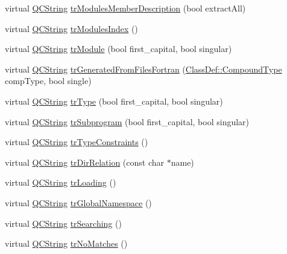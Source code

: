 \begin{DoxyCompactItemize}
\item 
virtual \hyperlink{class_q_c_string}{Q\-C\-String} \hyperlink{class_translator_polish_a26dd0f47c7f59841f901da7f4bd19306}{tr\-Modules\-Member\-Description} (bool extract\-All)
\item 
virtual \hyperlink{class_q_c_string}{Q\-C\-String} \hyperlink{class_translator_polish_a8a71cbe9e0669d3555731c3ebc0aae35}{tr\-Modules\-Index} ()
\item 
virtual \hyperlink{class_q_c_string}{Q\-C\-String} \hyperlink{class_translator_polish_a894e0b632e1680e918c78fea5b9b5384}{tr\-Module} (bool first\-\_\-capital, bool singular)
\item 
virtual \hyperlink{class_q_c_string}{Q\-C\-String} \hyperlink{class_translator_polish_ab89226b80b72b0ff8f4fca99626097ba}{tr\-Generated\-From\-Files\-Fortran} (\hyperlink{class_class_def_a768a6f0a6fd7e9087ff7971abbcc3f36}{Class\-Def\-::\-Compound\-Type} comp\-Type, bool single)
\item 
virtual \hyperlink{class_q_c_string}{Q\-C\-String} \hyperlink{class_translator_polish_a2763a6af55d1ca03be54604c2bc4a3b4}{tr\-Type} (bool first\-\_\-capital, bool singular)
\item 
virtual \hyperlink{class_q_c_string}{Q\-C\-String} \hyperlink{class_translator_polish_aeceda8d8c2b8645fd2337cb38d293269}{tr\-Subprogram} (bool first\-\_\-capital, bool singular)
\item 
virtual \hyperlink{class_q_c_string}{Q\-C\-String} \hyperlink{class_translator_polish_a196f3eb690f2748ee71f518cf02bd7fe}{tr\-Type\-Constraints} ()
\item 
virtual \hyperlink{class_q_c_string}{Q\-C\-String} \hyperlink{class_translator_polish_a38a56cc8bcc5323be9d1f09b0daa5933}{tr\-Dir\-Relation} (const char $\ast$name)
\item 
virtual \hyperlink{class_q_c_string}{Q\-C\-String} \hyperlink{class_translator_polish_aca8cf7409bceb9f8e6af47f637da5457}{tr\-Loading} ()
\item 
virtual \hyperlink{class_q_c_string}{Q\-C\-String} \hyperlink{class_translator_polish_aa9fd39641e570165be20c71c67481fee}{tr\-Global\-Namespace} ()
\item 
virtual \hyperlink{class_q_c_string}{Q\-C\-String} \hyperlink{class_translator_polish_aea79f5912e787bbb2c441223ccd382c6}{tr\-Searching} ()
\item 
virtual \hyperlink{class_q_c_string}{Q\-C\-String} \hyperlink{class_translator_polish_a240e49b617153456e0f29bef561cc10f}{tr\-No\-Matches} ()
\item 

\end{DoxyCompactItemize}
